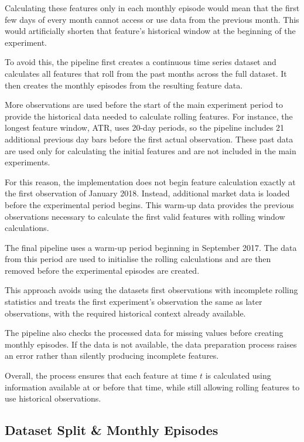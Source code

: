 Calculating these features only in each monthly episode would mean that
the first few days of every month cannot access or use data from the
previous month. This would artificially shorten that feature's
historical window at the beginning of the experiment.

To avoid this, the pipeline first creates a continuous time series
dataset and calculates all features that roll from the past months
across the full dataset. It then creates the monthly episodes from the
resulting feature data.

More observations are used before the start of the main experiment
period to provide the historical data needed to calculate rolling
features. For instance, the longest feature window, ATR, uses 20-day
periods, so the pipeline includes 21 additional previous day bars before
the first actual observation. These past data are used only for
calculating the initial features and are not included in the main
experiments.

For this reason, the implementation does not begin feature calculation
exactly at the first observation of January 2018. Instead, additional
market data is loaded before the experimental period begins. This
warm-up data provides the previous observations necessary to calculate
the first valid features with rolling window calculations.

The final pipeline uses a warm-up period beginning in September 2017.
The data from this period are used to initialise the rolling
calculations and are then removed before the experimental episodes are
created.

This approach avoids using the dataset\textquotesingle s first
observations with incomplete rolling statistics and treats the first
experiment's observation the same as later observations, with the
required historical context already available.

The pipeline also checks the processed data for missing values before
creating monthly episodes. If the data is not available, the data
preparation process raises an error rather than silently producing
incomplete features.

Overall, the process ensures that each feature at time \(t\) is
calculated using information available at or before that time, while
still allowing rolling features to use historical observations.

\subsection{Dataset Split \& Monthly Episodes}

